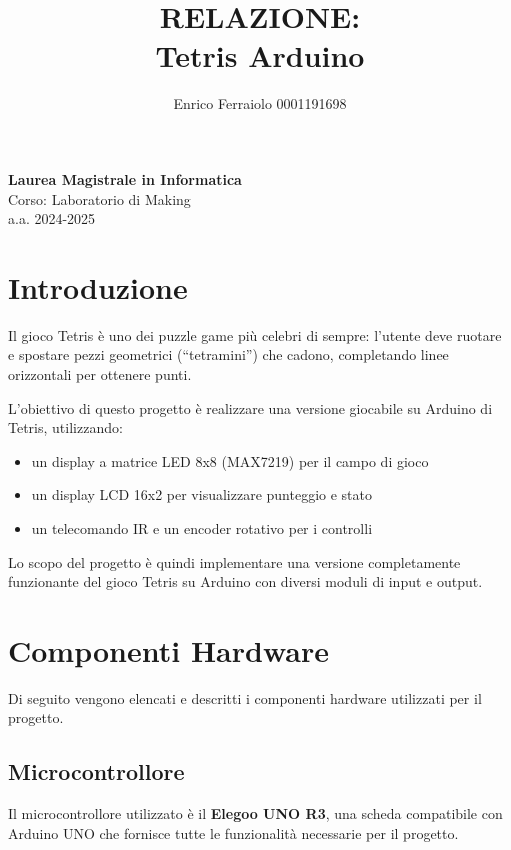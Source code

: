 \documentclass[a4paper, 12pt]{article}
\title{\textbf{RELAZIONE: \\ Tetris Arduino}}
\author{Enrico Ferraiolo 0001191698}
\date{}
\begin{document}
\maketitle

\begin{center}
	\textbf{Laurea Magistrale in Informatica}\\
	\vspace{0.3cm}
	Corso: Laboratorio di Making\\
	a.a. 2024-2025
	\vspace{2cm}
\end{center}

\newpage

\tableofcontents
\newpage

\section{Introduzione}
\label{sec:introduzione}
Il gioco Tetris è uno dei puzzle game più celebri di sempre: l'utente deve ruotare e spostare pezzi geometrici (``tetramini'') che cadono,
completando linee orizzontali per ottenere punti.

L'obiettivo di questo progetto è realizzare una versione giocabile su Arduino di Tetris, utilizzando:
\begin{itemize}
	\item un display a matrice LED 8x8 (MAX7219) per il campo di gioco
	\item un display LCD 16x2 per visualizzare punteggio e stato
	\item un telecomando IR e un encoder rotativo per i controlli
\end{itemize}

Lo scopo del progetto è quindi implementare una versione completamente funzionante del gioco Tetris su Arduino con diversi moduli di input e output.

\section{Componenti Hardware}
\label{sec:componenti-hardware}
Di seguito vengono elencati e descritti i componenti hardware utilizzati per il progetto.

\subsection{Microcontrollore}
\label{subsec:microcontrollore}
Il microcontrollore utilizzato è il \textbf{Elegoo UNO R3}, una scheda compatibile con Arduino UNO che fornisce tutte le funzionalità necessarie per il progetto.
\end{document}
